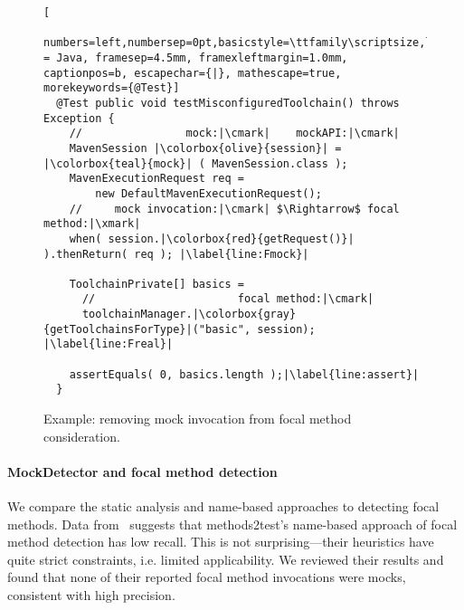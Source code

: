 \begin{figure}[h]
	\begin{lstlisting}[
	numbers=left,numbersep=0pt,basicstyle=\ttfamily\scriptsize,language = Java, framesep=4.5mm, framexleftmargin=1.0mm, captionpos=b, escapechar={|}, mathescape=true, morekeywords={@Test}]
  @Test public void testMisconfiguredToolchain() throws Exception {
    //                mock:|\cmark|    mockAPI:|\cmark|
    MavenSession |\colorbox{olive}{session}| = |\colorbox{teal}{mock}| ( MavenSession.class );
    MavenExecutionRequest req =
        new DefaultMavenExecutionRequest();
    //     mock invocation:|\cmark| $\Rightarrow$ focal method:|\xmark|
    when( session.|\colorbox{red}{getRequest()}| ).thenReturn( req ); |\label{line:Fmock}|

    ToolchainPrivate[] basics =
      //                      focal method:|\cmark|
      toolchainManager.|\colorbox{gray}{getToolchainsForType}|("basic", session); |\label{line:Freal}|

    assertEquals( 0, basics.length );|\label{line:assert}|
  }
  \end{lstlisting}

  \caption{Example: removing mock invocation from focal method consideration.}
  \label{fig:mockExampleEvaluation}
\end{figure}

\paragraph{MockDetector and focal method detection}
We compare the static analysis and name-based approaches to detecting focal methods.
Data from~\cite{tufano2020unit} suggests that methods2test's name-based approach of focal method detection has low recall. This is not surprising---their heuristics have quite strict constraints, i.e. limited applicability. We reviewed their results and found that none of their reported focal method invocations were mocks, consistent with high precision.

